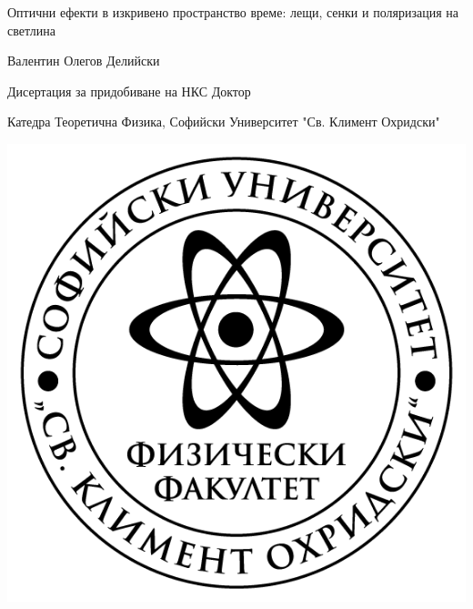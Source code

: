
\thispagestyle{empty}
\begin{center}

		\centering
		
		\vspace{3cm}
		{\Large Оптични ефекти в изкривено пространство време: лещи, сенки и поляризация на светлина\par}
		\vspace{1cm}
		{\Large Валентин Олегов Делийски\par}
		\vspace{1cm}
		{\Large Дисертация за придобиване на НКС Доктор\par}
		\vspace{1cm}
		{\Large Катедра Теоретична Физика, Софийски Университет "Св. Климент Охридски"\par}
		\vspace{3cm}
		\includegraphics[scale = 1]{logo-FzF.png}\\
		
		\newpage
\end{center}

	